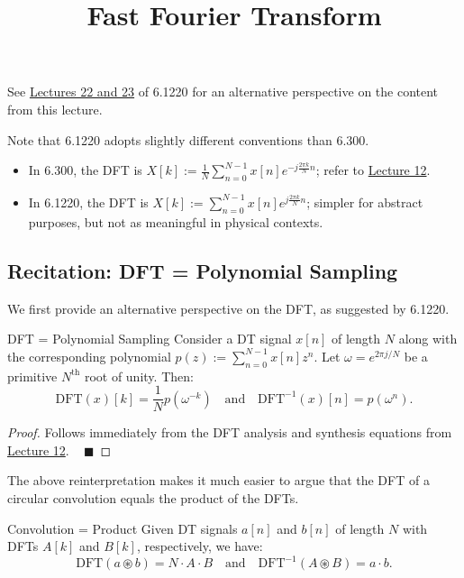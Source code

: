 \title{Fast Fourier Transform}



See \href{/6.1220/lectures/22-23/}{Lectures 22 and 23}
of 6.1220 for an alternative perspective on the content from this lecture.

\begin{remark}
    Note that 6.1220 adopts slightly different conventions than 6.300.
    \begin{itemize}
        \item In 6.300, the DFT is
        $X[k] := \frac{1}{N} \sum_{n = 0}^{N - 1} x[n] e^{-j\frac{2\pi k}{N}n}$;
        refer to \href{/6.300/lectures/12/#lecture-discrete-fourier-transform}{Lecture 12}.
        \item In 6.1220, the DFT is
        $X[k] := \sum_{n = 0}^{N - 1} x[n] e^{j\frac{2\pi k}{N}n}$;
        simpler for abstract purposes,
        but not as meaningful in physical contexts.
    \end{itemize}
\end{remark}

\subsection{Recitation: DFT = Polynomial Sampling}

We first provide an alternative perspective on the DFT,
as suggested by 6.1220.

\begin{theorem}{DFT = Polynomial Sampling}
    Consider a DT signal $x[n]$ of length $N$
    along with the corresponding polynomial $p(z) := \sum_{n = 0}^{N - 1} x[n] z^n$.
    Let $\omega = e^{2\pi j / N}$ be a primitive $N^{\text{th}}$ root of unity.
    Then:
    \[ \mathrm{DFT}(x)[k] = \frac{1}{N}p(\omega^{-k})
    ~~~ \text{ and } ~~~
    \mathrm{DFT}^{-1}(x)[n] = p(\omega^{n}). \]
\end{theorem}

\begin{proof}
    Follows immediately from the DFT analysis and synthesis equations from
    \href{/6.300/lectures/12/#lecture-discrete-fourier-transform}{Lecture 12}. ~ $\blacksquare$
\end{proof}

The above reinterpretation makes it much easier to argue
that the DFT of a circular convolution equals the product of the DFTs.

\begin{theorem}{Convolution = Product}
    Given DT signals $a[n]$ and $b[n]$ of length $N$
    with DFTs $A[k]$ and $B[k]$, respectively, we have:
    \[ \mathrm{DFT}(a \circledast b) = N \cdot A \cdot B
    ~~~ \text{ and } ~~~
    \mathrm{DFT}^{-1}(A \circledast B) = a \cdot b. \]
\end{theorem}

